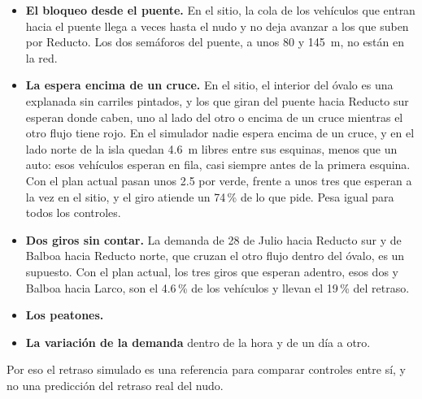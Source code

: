 \begin{itemize}
  \item \textbf{El bloqueo desde el puente.} En el sitio, la cola de
    los vehículos que entran hacia el puente llega a veces hasta el nudo
    y no deja avanzar a los que suben por Reducto. Los dos semáforos del
    puente, a unos 80 y 145~m, no están en la red.
  \item \textbf{La espera encima de un cruce.} En el sitio, el interior
    del óvalo es una explanada sin carriles pintados, y los que giran
    del puente hacia Reducto sur esperan donde caben, uno al lado del
    otro o encima de un cruce mientras el otro flujo tiene rojo. En el
    simulador nadie espera encima de un cruce, y en el lado norte de la
    isla quedan 4.6~m libres entre sus esquinas, menos que un auto: esos
    vehículos esperan en fila, casi siempre antes de la primera esquina.
    Con el plan actual pasan unos 2.5 por verde, frente a unos tres que
    esperan a la vez en el sitio, y el giro atiende un 74\,\% de lo que
    pide. Pesa igual para todos los controles.
  \item \textbf{Dos giros sin contar.} La demanda de 28 de Julio hacia
    Reducto sur y de Balboa hacia Reducto norte, que cruzan el otro
    flujo dentro del óvalo, es un supuesto. Con el plan actual, los
    tres giros que esperan adentro, esos dos y Balboa hacia Larco, son
    el 4.6\,\% de los vehículos y llevan el 19\,\% del retraso.
  \item \textbf{Los peatones.}
  \item \textbf{La variación de la demanda} dentro de la hora y de un
    día a otro.
\end{itemize}
Por eso el retraso simulado es una referencia para comparar controles
entre sí, y no una predicción del retraso real del nudo.

